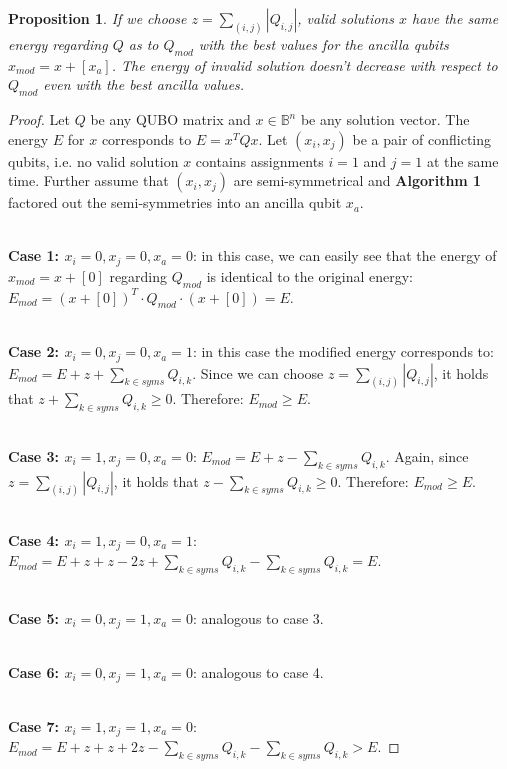 \documentclass[conference]{IEEEtran}
\theoremstyle{plain}
\newtheorem{proposition}[theorem]{Proposition}
\theoremstyle{definition}
\theoremstyle{remark}
\begin{document}
\begin{proposition}
If we choose $z = \sum_{(i,j)} |Q_{i,j}|$, valid solutions $x$ have the same energy regarding $Q$ as to $Q_{mod}$ with the best values for the ancilla qubits $x_{mod} = x + [x_a]$. The energy of invalid solution doesn't decrease with respect to $Q_{mod}$ even with the best ancilla values.
\end{proposition}
\begin{proof}
Let $Q$ be any QUBO matrix and $x \in \mathbb{B}^n$ be any solution vector. The energy $E$ for $x$ corresponds to $E = x^T Q x$. Let $(x_i,x_j)$ be a pair of conflicting qubits, i.e. no valid solution $x$ contains assignments $i=1$ and $j=1$ at the same time. Further assume that $(x_i,x_j)$ are semi-symmetrical and \textbf{Algorithm 1} factored out the semi-symmetries into an ancilla qubit $x_a$.

\ \\
\textbf{Case 1: $x_i = 0, x_j = 0, x_a = 0$}: in this case, we can easily see that the energy of $x_{mod} = x + [0]$ regarding $Q_{mod}$ is identical to the original energy: $E_{mod} = {(x + [0])}^T \cdot Q_{mod} \cdot (x + [0]) = E$.

\ \\
\textbf{Case 2: $x_i = 0, x_j = 0, x_a = 1$}: in this case the modified energy corresponds to: $E_{mod} = E + z + \sum_{k \in syms} Q_{i,k}$. Since we can choose $z = \sum_{(i,j)} |Q_{i,j}|$, it holds that $z + \sum_{k \in syms} Q_{i,k} \geq 0$. Therefore: $E_{mod} \geq E$.

\ \\
\textbf{Case 3: $x_i = 1, x_j = 0, x_a = 0$}: $E_{mod} = E + z - \sum_{k \in syms} Q_{i,k}$. Again, since $z = \sum_{(i,j)} |Q_{i,j}|$, it holds that $z - \sum_{k \in syms} Q_{i,k} \geq 0$. Therefore: $E_{mod} \geq E$.

\ \\
\textbf{Case 4: $x_i = 1, x_j = 0, x_a = 1$}: $E_{mod} = E + z + z - 2z + \sum_{k \in syms} Q_{i,k} - \sum_{k \in syms} Q_{i,k} = E$.

\ \\
\textbf{Case 5: $x_i = 0, x_j = 1, x_a = 0$}: analogous to case 3.

\ \\
\textbf{Case 6: $x_i = 0, x_j = 1, x_a = 0$}: analogous to case 4.

\ \\
\textbf{Case 7: $x_i = 1, x_j = 1, x_a = 0$}: $E_{mod} = E + z + z + 2z - \sum_{k \in syms} Q_{i,k} - \sum_{k \in syms} Q_{i,k} > E$.


\end{proof}
\end{document}
